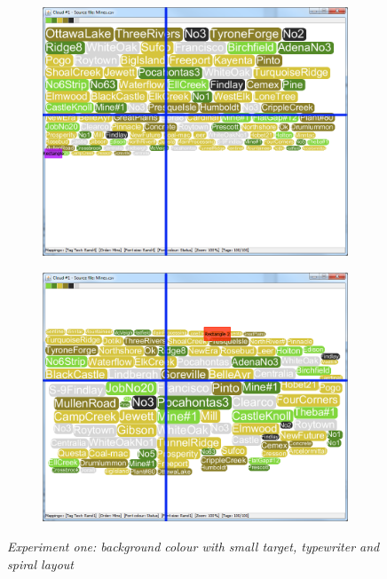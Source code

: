 \begin{figure}[!htb]
\begin{subfigure}{.5\textwidth}
  \includegraphics[scale=0.25]{Experiment1/Trial4/C1S1L2.png}
\end{subfigure}%
\begin{subfigure}{.5\textwidth}
  \centering
 \includegraphics[scale=0.25]{Experiment1/Trial4/C1S1L1.png}
\end{subfigure}
\caption{\textit{Experiment one: background colour with small target, typewriter and spiral layout}}
\label{fig:target3}
\end{figure}



